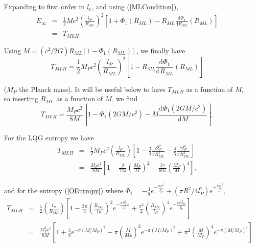 \documentclass[nofootinbib,aps,prd,preprint,groupedaddress,showpacs,showkeys]{revtex4-1}
\newcommand{\dif}{\mathrm{d}}
\begin{document}
\noindent Expanding to first order in $l_c$, and using (\ref{MLCondition}),
\begin{eqnarray}
E_{\infty} &=& \frac{1}{2} Mc^2 \left( \frac{l_P}{R_{ML}} \right)^2 \left[ 1 + \Phi_1(R_{ML}) - R_{ML} \frac{\dif \Phi_1}{\dif R_{ML}}(R_{ML}) \right] \nonumber \\
&=& T_{MLH}.
\end{eqnarray}

\noindent Using $M = (c^2/2G) R_{ML} [1 - \Phi_1(R_{ML})]$, we finally have
\begin{equation}
T_{MLH} = \frac{1}{2} M_P c^2 \left( \frac{l_P}{R_{ML}} \right)^2 \left[ 1 - R_{ML} \frac{\dif \Phi_1}{\dif R_{ML}}(R_{ML}) \right]
\end{equation}

\noindent ($M_P$ the Planck mass). It will be useful below to have $T_{MLH}$ as a function of $M$, so inserting $R_{ML}$ as a function of $M$, we find
\begin{equation}
T_{MLH} = \frac{M_P c^2}{8M} \left[ 1 - \Phi_1(2GM/c^2) - M \frac{\dif \Phi_1(2GM/c^2)}{\dif M} \right].
\end{equation}

\indent For the LQG entropy we have
\begin{eqnarray}
T_{MLH} &=& \frac{1}{2} M_P c^2 \left(\frac{l_P}{R_{ML}}\right) \left[1 - \frac{2}{3} \frac{\beta l_P^2}{\pi R_{ML}^2} - \frac{4}{5} \frac{\gamma l_P^4}{\pi R_{ML}^4} \right] \nonumber \\
&=& \frac{M_P c^2}{8M} \left[1 - \frac{\beta}{12\pi} \left(\frac{M_P}{M}\right)^2 - \frac{3\gamma}{80 \pi} \left( \frac{M_P}{M} \right)^4 \right],
\end{eqnarray}

\noindent and for the entropy (\ref{OEntropy}) where $\Phi_1 = -\frac{3}{8} e^{-\frac{\pi R^2}{l_P^2}} + (\pi R^2 / 4l_P^2) e^{-\frac{\pi R^2}{l_P^2}}$,
\begin{eqnarray}
T_{MLH} &=& \frac{1}{2} \left(\frac{l_P}{R_{ML}}\right) \left[1 - \frac{3\pi}{4} \left(\frac{R_{ML}}{l_P}\right)^2 e^{-\frac{\pi R_{ML}^2}{l_P^2}} + \frac{\pi^2}{2} \left(\frac{R_{ML}}{l_P}\right)^4 e^{-\frac{\pi R_{ML}^2}{l_P^2}} \right] \nonumber \\
&=& \frac{M_P^2 c^2}{8M} \left[1 + \frac{3}{8} e^{-\pi (M/M_P)^2} - \pi \left(\frac{M}{M_P}\right)^2 e^{-\pi (M/M_P)^2} + \pi^2 \left( \frac{M}{M_P} \right)^4 e^{-\pi (M/M_P)^2} \right]. \nonumber \\
\end{eqnarray}
\end{document}
